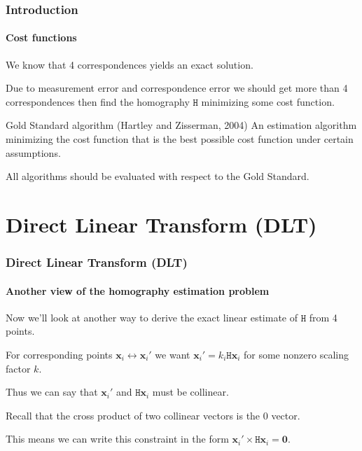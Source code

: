 \documentclass[aspectratio=169]{beamer}
\renewcommand{\vec}[1]{\boldsymbol{#1}}
\newcommand{\mat}[1]{\mathtt{#1}}
\begin{document}
\begin{frame}
\frametitle{Introduction}
\framesubtitle{Cost functions}

We know that 4 correspondences yields an \alert{exact solution}.

\medskip

Due to \alert{measurement error} and \alert{correspondence error} we
should get \alert{more than 4 correspondences} then find the
homography $\mat{H}$ minimizing some \alert{cost function}.

\medskip

\begin{block}{Gold Standard algorithm (Hartley and Zisserman, 2004)}
An estimation algorithm minimizing the cost function that
is \alert{the best possible cost function} under certain assumptions.
\end{block}

\medskip

All algorithms should be evaluated with respect to the Gold Standard.

\end{frame}

\section{Direct Linear Transform (DLT)}

\begin{frame}
\frametitle{Direct Linear Transform (DLT)}
\framesubtitle{Another view of the homography estimation problem}

Now we'll look at another way to derive the exact linear estimate of
$\mat{H}$ from 4 points.

\medskip

For corresponding points $\vec{x}_i \leftrightarrow \vec{x}_i'$ we
want $\vec{x}_i' = k_i \mat{H} \vec{x}_i$ for some nonzero scaling
factor $k$.

\medskip

Thus we can say that $\vec{x}_i'$ and $\mat{H}\vec{x}_i$ must be collinear.

\medskip

Recall that the \alert{cross product} of two collinear vectors is the
0 vector.

\medskip

This means we can write this constraint in the form
$\vec{x}_i' \times \mat{H} \vec{x}_i = \vec{0}$.

\end{frame}
\end{document}
